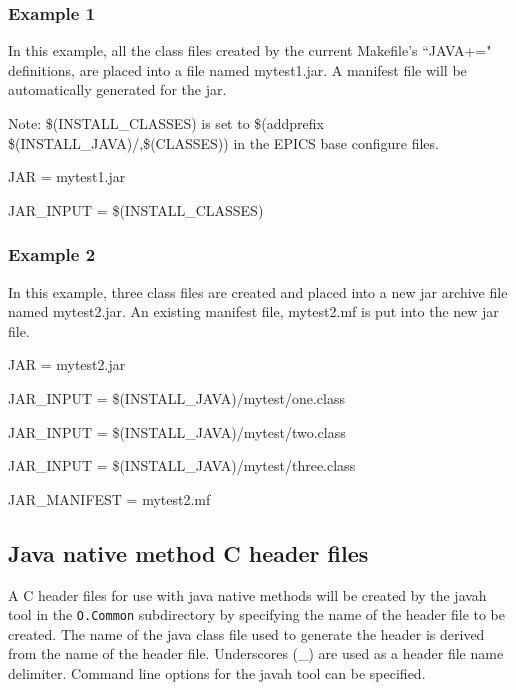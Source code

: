 \subsubsection{Example 1}

In this example, all the class files created by the current Makefile's ``JAVA+=" definitions, are placed into a file named 
mytest1.jar. A manifest file will be automatically generated for the jar. 

Note: \$(INSTALL\_CLASSES) is set to \$(addprefix \$(INSTALL\_JAVA)/,\$(CLASSES)) in the EPICS base configure 
files.

\begin{description}

\item {}JAR = mytest1.jar

\item {}JAR\_INPUT = \$(INSTALL\_CLASSES)

\end{description}

\subsubsection{Example 2}

In this example, three class files are created and placed into a new jar archive file named mytest2.jar. An existing manifest 
file, mytest2.mf is put into the new jar file.

\begin{description}

\item JAR = mytest2.jar

\item JAR\_INPUT = \$(INSTALL\_JAVA)/mytest/one.class

\item JAR\_INPUT = \$(INSTALL\_JAVA)/mytest/two.class

\item JAR\_INPUT = \$(INSTALL\_JAVA)/mytest/three.class

\item JAR\_MANIFEST = mytest2.mf

\end{description}

\subsection{Java native method C header files}

A C header files for use with java native methods will be created by the javah tool in the \verb|O.Common| subdirectory by 
specifying the name of the header file to be created. The name of the java class file used to generate the header is derived 
from the name of the header file. Underscores (\_) are used as a header file name delimiter. Command line options for the 
javah tool can be specified.

